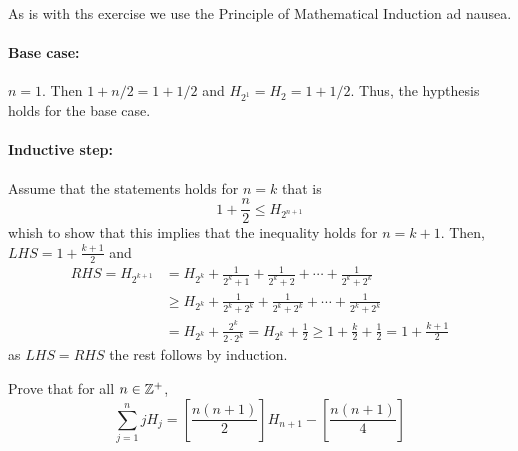 \documentclass[a4paper, english, 12pt]{article} %
\newcommand{\solutions}{false} %
\begin{document}
\begin{answer}
  As is with ths exercise we use the Principle of Mathematical Induction
  ad nausea. \paragraph{Base case:} $n=1$. Then $1 + n/2 = 1 + 1/2$ and $H_{2^1} = H_2
  = 1 + 1/2$. Thus, the hypthesis holds for the base case.
  \paragraph{Inductive step:} Assume that the statements holds for $n=k$ that is
  \begin{equation*}
    1 + \frac{n}{2} \leq H_{2^{n+1}}
  \end{equation*}
  whish to show that this implies that the inequality holds for $n=k+1$. Then,
  $LHS = 1 + \frac{k+1}{2}$ and
  \begin{align*}
    RHS = H_{2^{k+1}}
    & = H_{2^k} + \frac{1}{2^k+1} + \frac{1}{2^k + 2} + \cdots + \frac{1}{2^k + 2^k} \\
    & \geq H_{2^k} + \frac{1}{2^k+2^k} + \frac{1}{2^k + 2^k} + \cdots + \frac{1}{2^k + 2^k} \\
    & = H_{2^k} + \frac{2^k}{2 \cdot 2^k}
      = H_{2^{k}} + \frac{1}{2}
      \geq 1 + \frac{k}{2} + \frac{1}{2} = 1 + \frac{k+1}{2}
  \end{align*}
  as $LHS = RHS$ the rest follows by induction. 
\end{answer}

\ifthenelse{\boolean{\solutions}}{\newpage}{}

\begin{subproblem}
  Prove that for all $n \in \mathbb{Z}^+$,
  \begin{equation*}
    \sum_{j=1}^n j H_j
    = \left[ \frac{n(n+1)}{2} \right] H_{n+1} - \left[ \frac{n(n+1)}{4} \right]
  \end{equation*}
\end{subproblem}
\end{document}
